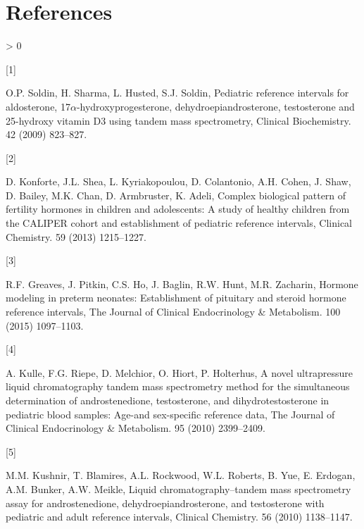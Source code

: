 \documentclass[]{elsarticle} %
\newlength{\csllabelwidth}
\newlength{\cslhangindent}
\newenvironment{CSLReferences}[3] %
 {%
  \setlength{\parindent}{0pt}
  \ifodd #1 \everypar{\setlength{\hangindent}{\cslhangindent}}\ignorespaces\fi
  \ifnum #2 > 0
  \setlength{\parskip}{#2\baselineskip}
  \fi
 }%
 {}
\newcommand{\CSLLeftMargin}[1]{\parbox[t]{\csllabelwidth}{#1}}
\newcommand{\CSLRightInline}[1]{\parbox[t]{\linewidth - \csllabelwidth}{#1}}
\begin{document}
\hypertarget{references}{%
\section*{References}\label{references}}

\hypertarget{refs}{}
\begin{CSLReferences}{0}{0}
\leavevmode\hypertarget{ref-soldin2009pediatric}{}%
\CSLLeftMargin{{[}1{]} }
\CSLRightInline{O.P. Soldin, H. Sharma, L. Husted, S.J. Soldin,
Pediatric reference intervals for aldosterone,
17\(\alpha\)-hydroxyprogesterone, dehydroepiandrosterone, testosterone
and 25-hydroxy vitamin D3 using tandem mass spectrometry, Clinical
Biochemistry. 42 (2009) 823--827.}

\leavevmode\hypertarget{ref-konforte2013complex}{}%
\CSLLeftMargin{{[}2{]} }
\CSLRightInline{D. Konforte, J.L. Shea, L. Kyriakopoulou, D. Colantonio,
A.H. Cohen, J. Shaw, D. Bailey, M.K. Chan, D. Armbruster, K. Adeli,
Complex biological pattern of fertility hormones in children and
adolescents: A study of healthy children from the CALIPER cohort and
establishment of pediatric reference intervals, Clinical Chemistry. 59
(2013) 1215--1227.}

\leavevmode\hypertarget{ref-greaves2015hormone}{}%
\CSLLeftMargin{{[}3{]} }
\CSLRightInline{R.F. Greaves, J. Pitkin, C.S. Ho, J. Baglin, R.W. Hunt,
M.R. Zacharin, Hormone modeling in preterm neonates: Establishment of
pituitary and steroid hormone reference intervals, The Journal of
Clinical Endocrinology \& Metabolism. 100 (2015) 1097--1103.}

\leavevmode\hypertarget{ref-kulle2010novel}{}%
\CSLLeftMargin{{[}4{]} }
\CSLRightInline{A. Kulle, F.G. Riepe, D. Melchior, O. Hiort, P.
Holterhus, A novel ultrapressure liquid chromatography tandem mass
spectrometry method for the simultaneous determination of
androstenedione, testosterone, and dihydrotestosterone in pediatric
blood samples: Age-and sex-specific reference data, The Journal of
Clinical Endocrinology \& Metabolism. 95 (2010) 2399--2409.}

\leavevmode\hypertarget{ref-kushnir2010liquid}{}%
\CSLLeftMargin{{[}5{]} }
\CSLRightInline{M.M. Kushnir, T. Blamires, A.L. Rockwood, W.L. Roberts,
B. Yue, E. Erdogan, A.M. Bunker, A.W. Meikle, Liquid
chromatography--tandem mass spectrometry assay for androstenedione,
dehydroepiandrosterone, and testosterone with pediatric and adult
reference intervals, Clinical Chemistry. 56 (2010) 1138--1147.}


\end{CSLReferences}
\end{document}
